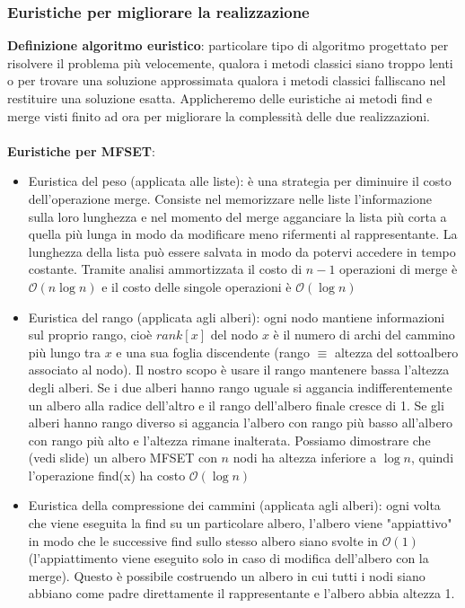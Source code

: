 \documentclass[../cheatSheetAlgoritmi.tex]{subfiles}
\begin{document}
\subsubsection{Euristiche per migliorare la realizzazione}
\textbf{Definizione algoritmo euristico}: particolare tipo di algoritmo progettato per risolvere il problema più velocemente, qualora i metodi classici siano troppo lenti o per trovare una soluzione approssimata qualora i metodi classici falliscano nel restituire una soluzione esatta. Applicheremo delle euristiche ai metodi find e merge visti finito ad ora per migliorare la complessità delle due realizzazioni. \\\\
\textbf{Euristiche per MFSET}:
\begin{itemize}
	\item Euristica del peso (applicata alle liste): è una strategia per diminuire il costo dell'operazione merge. Consiste nel memorizzare nelle liste l'informazione sulla loro lunghezza e nel momento del merge agganciare la lista più corta a quella più lunga in modo da modificare meno rifermenti al rappresentante. La lunghezza della lista può essere salvata in modo da potervi accedere in tempo costante. Tramite analisi ammortizzata il costo di $n-1$ operazioni di merge è $\mathcal{O}(n \log n)$ e il costo delle singole operazioni è $\mathcal{O}(\log n)$
	\item Euristica del rango (applicata agli alberi): ogni nodo mantiene informazioni sul proprio rango, cioè $rank[x]$ del nodo $x$ è il numero di archi del cammino più lungo tra $x$ e una sua foglia discendente (rango $\equiv$ altezza del sottoalbero associato al nodo). Il nostro scopo è usare il rango mantenere bassa l'altezza degli alberi. Se i due alberi hanno rango uguale si aggancia indifferentemente un albero alla radice dell'altro e il rango dell'albero finale cresce di 1. Se gli alberi hanno rango diverso si aggancia l'albero con rango più basso all'albero con rango più alto e l'altezza rimane inalterata. Possiamo dimostrare che (vedi slide) un albero MFSET con $n$ nodi ha altezza inferiore a $\log n$, quindi l'operazione find(x) ha costo $\mathcal{O}(\log n)$
	\item Euristica della compressione dei cammini (applicata agli alberi): ogni volta che viene eseguita la find su un particolare albero, l'albero viene "appiattivo" in modo che le successive find sullo stesso albero siano svolte in $\mathcal{O}(1)$ (l'appiattimento viene eseguito solo in caso di modifica dell'albero con la merge). Questo è possibile costruendo un albero in cui tutti i nodi siano abbiano come padre direttamente il rappresentante e l'albero abbia altezza 1.  
\end{itemize}
\end{document}
